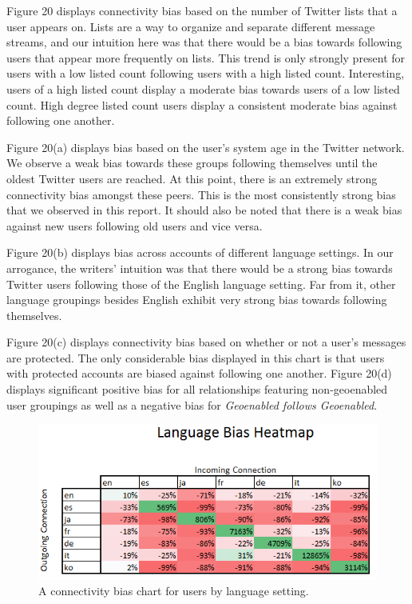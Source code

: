 Figure 20 displays connectivity bias based on the number of Twitter lists that a user appears on.  Lists are a way to organize and separate different message streams, and our intuition here was that there would be a bias towards following users that appear more frequently on lists.  This trend is only strongly present for users with a low listed count following users with a high listed count.  Interesting, users of a high listed count display a moderate bias towards users of a low listed count.  High degree listed count users display a consistent moderate bias against following one another.

Figure 20(a) displays bias based on the user's system age in the Twitter network.  We observe a weak bias towards these groups following themselves until the oldest Twitter users are reached.  At this point, there is an extremely strong connectivity bias amongst these peers.  This is the most consistently strong bias that we observed in this report.  It should also be noted that there is a weak bias against new users following old users and vice versa.

Figure 20(b) displays bias across accounts of different language settings.  In our arrogance, the writers' intuition was that there would be a strong bias towards Twitter users following those of the English language setting.  Far from it, other language groupings besides English exhibit very strong bias towards following themselves.

Figure 20(c) displays connectivity bias based on whether or not a user's messages are protected.  The only considerable bias displayed in this chart is that users with protected accounts are biased against following one another.  Figure 20(d) displays significant positive bias for all relationships featuring non-geoenabled user groupings as well as a negative bias for \textit{Geoenabled follows Geoenabled}.


\begin{figure}[t]
 \centering
 \includegraphics[bb=0 0 424 194, scale=.5]{./images/Bates-Final/lang.png}
 \caption{A connectivity bias chart for users by language setting.}
 \label{fig:lang}
\end{figure}

